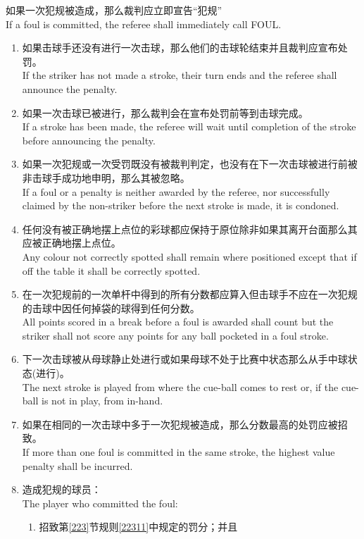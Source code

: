 \noindent 如果一次犯规被造成，那么裁判应立即宣告``犯规''\\
If a foul is committed, the referee shall immediately call FOUL.
\begin{enumerate}[label=(\alph*)]
    \item 如果击球手还没有进行一次击球，那么他们的击球轮结束并且裁判应宣布处罚。\\
    If the striker has not made a stroke, their turn ends and the referee shall announce the penalty.
    \item 如果一次击球已被进行，那么裁判会在宣布处罚前等到击球完成。\\
    If a stroke has been made, the referee will wait until completion of the stroke before announcing the penalty.
    \item 如果一次犯规或一次受罚既没有被裁判判定，也没有在下一次击球被进行前被非击球手成功地申明，那么其被忽略。\\
    If a foul or a penalty is neither awarded by the referee, nor successfully claimed by the non-striker before the next stroke is made, it is condoned.
    \item 任何没有被正确地摆上点位的彩球都应保持于原位除非如果其离开台面那么其应被正确地摆上点位。\\
    Any colour not correctly spotted shall remain where positioned except that if off the table it shall be correctly spotted.
    \item 在一次犯规前的一次单杆中得到的所有分数都应算入但击球手不应在一次犯规的击球中因任何掉袋的球得到任何分数。\\
    All points scored in a break before a foul is awarded shall count but the striker shall not score any points for any ball pocketed in a foul stroke.
    \item 下一次击球被从母球静止处进行或如果母球不处于比赛中状态那么从手中球状态(进行)。\\
    The next stroke is played from where the cue-ball comes to rest or, if the cue-ball is not in play, from in-hand.
    \item 如果在相同的一次击球中多于一次犯规被造成，那么分数最高的处罚应被招致。\\
    If more than one foul is committed in the same stroke, the highest value penalty shall be incurred.
    \item 造成犯规的球员：\\
    The player who committed the foul:
    \begin{enumerate}[label=(\roman*)]
        \item 招致第\ref{223}节规则\ref{22311}中规定的罚分；并且\\

\end{enumerate}
\end{enumerate}
